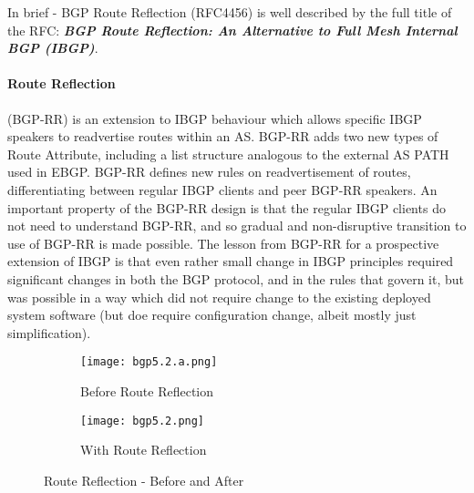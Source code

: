 In brief - BGP Route Reflection (RFC4456) is well described by the full title
of the RFC: \textbf{\textit{BGP Route Reflection: An Alternative to Full Mesh Internal BGP
(IBGP)}}.

\paragraph{Route Reflection}
 (BGP-RR) is an extension to IBGP behaviour which allows
specific IBGP speakers to readvertise routes within an AS. BGP-RR adds two new
types of Route Attribute, including a list structure analogous to the external
AS PATH used in EBGP.  BGP-RR defines new rules on readvertisement of routes,
differentiating between regular IBGP clients and peer BGP-RR speakers.  An
important property of the BGP-RR design is that the regular IBGP clients do
not need to understand BGP-RR, and so gradual and non-disruptive transition to
use of BGP-RR is made possible.  The lesson from BGP-RR for a prospective
extension of IBGP is that even rather small change in IBGP principles required
significant changes in both the BGP protocol, and in the rules that govern it,
but was possible in a way which did not require change to the existing deployed
system software (but doe require configuration change, albeit mostly just
simplification).


\begin{figure}[H]
    \centering 
    \begin{subfigure}{0.48\textwidth}
        \centering
        \texttt{[image: bgp5.2.a.png]} 
        \caption{Before Route Reflection}
        \label{fig:Before Route Reflection}
    \end{subfigure}
    \hfill 
    \begin{subfigure}{0.48\textwidth}
        \centering
        \texttt{[image: bgp5.2.png]} 
        \caption{With Route Reflection}
        \label{fig:With Route Reflection}
    \end{subfigure}

    \caption{Route Reflection - Before and After}
    \label{fig:Route Reflection}
\end{figure}


